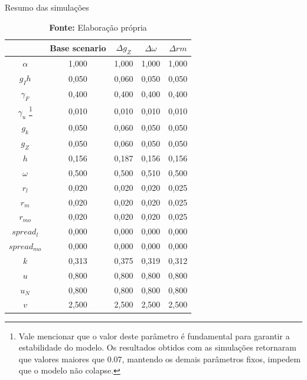 \begin{table}[htb]
    \centering
    \caption{Resumo das simulações}
    \label{Resumo_Simulacao}
         \begin{tabular}{ccccc}
\toprule
{} &  Base scenario &  $\Delta g_Z$ &  $\Delta \omega$ &  $\Delta rm$ \\
\midrule
\textbf{$\alpha$    } &          1,000 &         1,000 &            1,000 &        1,000 \\
\textbf{$g_Ih$     } &          0,050 &         0,060 &            0,050 &        0,050 \\
\textbf{$\gamma_F$  } &          0,400 &         0,400 &            0,400 &        0,400 \\
\textbf{$\gamma_u$  }\footnote{Vale mencionar que o valor deste parâmetro é fundamental para garantir a estabilidade do modelo. Os resultados obtidos com as simulações retornaram que valores maiores que 0.07, mantendo os demais parâmetros fixos, impedem que o modelo não colapse.}
                      &          0,010 &         0,010 &            0,010 &        0,010 \\
\textbf{$g_k$       } &          0,050 &         0,060 &            0,050 &        0,050 \\
\textbf{$g_Z$       } &          0,050 &         0,060 &            0,050 &        0,050 \\
\textbf{$h$        } &          0,156 &         0,187 &            0,156 &        0,156 \\
\textbf{$\omega$    } &          0,500 &         0,500 &            0,510 &        0,500 \\
\textbf{$r_l$       } &          0,020 &         0,020 &            0,020 &        0,025 \\
\textbf{$r_m$       } &          0,020 &         0,020 &            0,020 &        0,025 \\
\textbf{$r_{mo}$      } &          0,020 &         0,020 &            0,020 &        0,025 \\
\textbf{$spread_l$ } &          0,000 &         0,000 &            0,000 &        0,000 \\
\textbf{$spread_{mo}$} &          0,000 &         0,000 &            0,000 &        0,000 \\
\textbf{$k$      } &          0,313 &         0,375 &            0,319 &        0,312 \\
\textbf{$u$        } &          0,800 &         0,800 &            0,800 &        0,800 \\
\textbf{$u_N$       } &          0,800 &         0,800 &            0,800 &        0,800 \\
\textbf{$v$        } &          2,500 &         2,500 &            2,500 &        2,500 \\
\bottomrule
\end{tabular}
    \label{Summary_Simplest}
    \caption*{\textbf{Fonte:} Elaboração própria}
\end{table}
